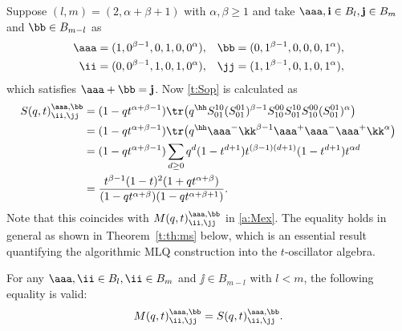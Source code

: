 \begin{exam}\label{a:ex:S}
Suppose  $(l,m)=(2,\alpha+\beta+1)$ with $\alpha, \beta \ge 1$ and take
$\aaa, {\bf i} \in B_l, {\bf j} \in B_m$ and $\bb \in B_{m-l}$ as
\begin{align*}
\aaa & = (1,0^{\beta-1},0,1,0,0^\alpha),
&
\bb & = (0,1^{\beta-1},0,0,0,1^\alpha),
\\
\ii & = (0,0^{\beta-1},1,0,1,0^\alpha),
&
\jj &= (1,1^{\beta-1},0,1,0,1^\alpha),
\end{align*}
which satisfies $\aaa + \bb={\bf j}$. 
Now \eqref{t:Sop} is calculated as
\begin{align*}
S(q,t) _{\ii,\jj}^{\aaa,\bb}&= (1 - q t^{\alpha+\beta-1}) 
\tr \bigl(q^\hh S^{10}_{01}(S^{01}_{01})^{\beta-1} S^{00}_{10}
S^{10}_{01}S^{00}_{10}(S^{01}_{01})^\alpha \bigr)
\\
&= (1 - q t^{\alpha+\beta-1}) 
\tr \bigl(q^\hh \aaa^- \kk^{\beta-1} \aaa^+ \aaa^- \aaa^+ \kk^\alpha \bigr)
\\
&=(1 - q t^{\alpha+\beta-1}) \sum_{d\ge 0}q^d(1-t^{d+1})t^{(\beta-1)(d+1)}(1-t^{d+1})t^{\alpha d}
\\ & = \frac{t^{\beta-1}(1-t)^2(1+qt^{\alpha+\beta})}{(1-qt^{\alpha+\beta})(1-qt^{\alpha+\beta+1})}.
\end{align*}
Note that this coincides with  $M(q,t) _{\ii,\jj}^{\aaa,\bb}$ in \eqref{a:Mex}.
The equality holds in general as shown in Theorem~\ref{t:th:ms} below, which is 
an essential result quantifying the algorithmic MLQ construction into the $t$-oscillator algebra.
\end{exam}

\begin{theo}\label{t:th:ms}
For any $\aaa, \ii \in B_l, \ii \in B_m$ and $\jj \in B_{m-l}$ with $l<m$, the following equality is valid:
\begin{equation}
\label{t:ms}
M(q,t)_{\ii,\jj}^{\aaa,\bb} = S(q,t)_{\ii,\jj}^{\aaa,\bb}.
\end{equation}
\end{theo}

